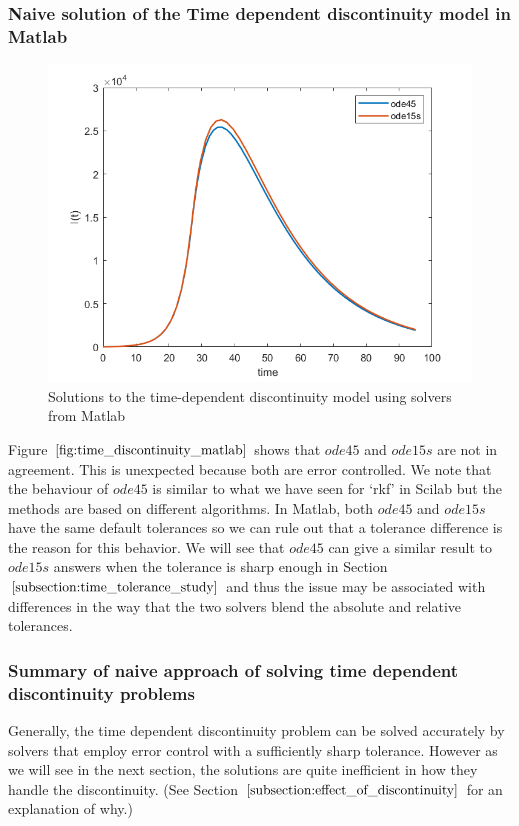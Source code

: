 \subsubsection{Naive solution of the Time dependent discontinuity model in Matlab}
\begin{figure}[H]
\centering
\includegraphics[width=0.7\linewidth]{./figures/time_discontinuity_matlab}
\caption{Solutions to the time-dependent discontinuity model using solvers from Matlab}
\label{fig:time_discontinuity_matlab}
\end{figure}
Figure $\ref{fig:time_discontinuity_matlab}$ shows that $ode45$ and $ode15s$ are not in agreement. This is unexpected because both are error controlled. We note that the behaviour of $ode45$ is similar to what we have seen for `rkf' in Scilab but the methods are based on different algorithms. In Matlab, both $ode45$ and $ode15s$ have the same default tolerances so we can rule out that a tolerance difference is the reason for this behavior. We will see that $ode45$ can give a similar result to $ode15s$ answers when the tolerance is sharp enough in Section $\ref{subsection:time_tolerance_study}$ and thus the issue may be associated with differences in the way that the two solvers blend the absolute and relative tolerances.

\subsubsection{Summary of naive approach of solving time dependent discontinuity problems}
Generally, the time dependent discontinuity problem can be solved accurately by solvers that employ error control with a sufficiently sharp tolerance. However as we will see in the next section, the solutions are quite inefficient in how they handle the discontinuity. (See Section $\ref{subsection:effect_of_discontinuity}$ for an explanation of why.)

